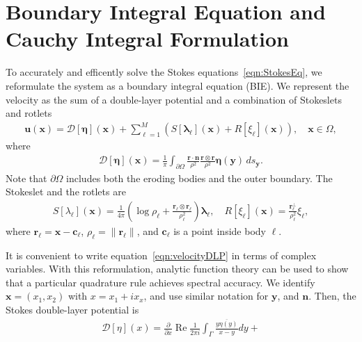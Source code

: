 \documentclass[3p]{elsarticle}
\newcommand{\bd}{{\partial}}
\newcommand{\cc}{{\mathbf{c}}}
\newcommand{\DDD}{{\boldsymbol{\mathcal D}}}
\newcommand{\eeta}{{\boldsymbol\eta}}
\newcommand{\llambda}{{\boldsymbol\lambda}}
\newcommand{\nn}{{\mathbf{n}}}
\newcommand{\rr}{{\mathbf{r}}}
\renewcommand{\Re}{{\operatorname{Re}}}
\newcommand{\uu}{{\mathbf{u}}}
\newcommand{\xx}{{\mathbf{x}}}
\newcommand{\yy}{{\mathbf{y}}}
\newcommand{\pderiv}[2]{\frac{\partial #1}{\partial #2}}
\begin{document}


\section{Boundary Integral Equation and Cauchy Integral Formulation}
\label{sec:DLP}
To accurately and efficently solve the Stokes
  equations~\eqref{eqn:StokesEq}, we reformulate the system as a
  boundary integral equation (BIE). We represent the velocity as the sum
  of a double-layer potential and a combination of Stokeslets and
  rotlets~\cite{pow-mir1987}
\begin{align}
  \uu(\xx) = \DDD[\eeta](\xx) + \sum_{\ell=1}^{M}\left(
    S[\llambda_\ell](\xx) + R[\xi_\ell](\xx)\right), 
    \quad \xx \in \Omega,
  \label{eqn:velocity}
\end{align}
where 
\begin{align}
  \DDD[\eeta](\xx) = \frac{1}{\pi}\int_{\bd\Omega} 
  \frac{\rr \cdot \nn}{\rho^2} \frac{\rr \otimes \rr}{\rho^2}
  \eeta(\yy) \, ds_\yy.
  \label{eqn:velocityDLP}
\end{align}
Note that $\bd\Omega$ includes both the eroding bodies and the outer
boundary. The Stokeslet and the rotlets are
\begin{align}
  S[\lambda_\ell](\xx) = \frac{1}{4\pi} \left(\log \rho_\ell +
  \frac{\rr_\ell \otimes \rr_\ell}{\rho_\ell^2} \right) \llambda_\ell,
  \quad
  R[\xi_\ell](\xx) = \frac{\rr_\ell^\perp}{\rho_\ell^2}\xi_\ell,
\end{align}
where $\rr_\ell = \xx - \cc_\ell$, $\rho_\ell = \|\rr_\ell\|$, and
$\cc_\ell$ is a point inside body $\ell$.

It is convenient to write equation~\eqref{eqn:velocityDLP} in terms of
complex variables. With this reformulation, analytic function theory can
be used to show that a particular quadrature rule achieves spectral
accuracy. We identify $\xx = (x_1,x_2)$ with $x = x_1 + ix_x$, and use
similar notation for $\yy$, and $\nn$. Then, the Stokes double-layer
potential is 
\begin{align}
  \DDD[\eta](x) = \pderiv{}{x} \Re \frac{1}{2\pi i} \int_\Gamma
    \frac{\overline{y \eta(y)}}{x-y} dy + 
\end{align}
\end{document}
